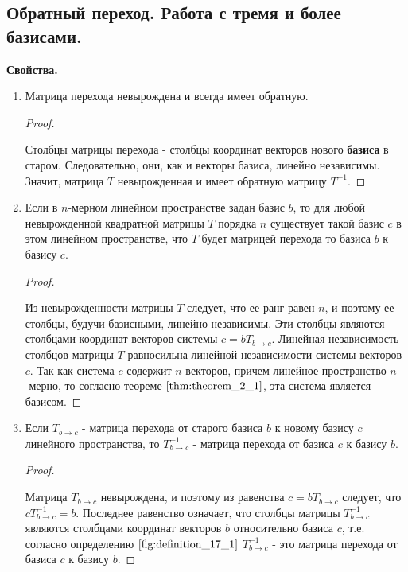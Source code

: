 \subsection{
    Обратный переход. Работа с тремя и более базисами.
}

\textbf{Свойства.}

\begin{enumerate}[label={\arabic*°.}]
    \item Матрица перехода невырождена и всегда имеет обратную.
    \begin{proof}~

        Столбцы матрицы перехода - столбцы координат векторов нового \textbf{базиса} в старом. Следовательно, они, как и векторы базиса, линейно независимы. Значит, матрица $T$ невырожденная и имеет обратную матрицу $T^{-1}$.
    \end{proof}
    
    \item Если в $n$-мерном линейном пространстве задан базис $b$, то для любой невырожденной квадратной матрицы $T$ порядка $n$ существует такой базис $c$ в этом линейном пространстве, что $T$ будет матрицей перехода то базиса $b$ к базису $c$.
    \begin{proof}~

        Из невырожденности матрицы $T$ следует, что ее ранг равен $n$, и поэтому ее столбцы, будучи базисными, линейно независимы. Эти столбцы являются столбцами координат векторов системы $c = bT_{b \to c}$. Линейная независимость столбцов матрицы $T$ равносильна линейной независимости системы векторов $c$. Так как система $c$ содержит $n$ векторов, причем линейное пространство $n$-мерно, то согласно теореме $\eqref{thm:theorem_2_1}$, эта система является базисом.
    \end{proof}
    
    \item Если $T_{b \to c}$ - матрица перехода от старого базиса $b$ к новому базису $c$ линейного пространства, то $T^{-1}_{b \to c}$ - матрица перехода от базиса $c$ к базису $b$.
    \begin{proof}~

        Матрица $T_{b \to c}$ невырождена, и поэтому из равенства $c = bT_{b \to c}$ следует, что $cT^{-1}_{b \to c} = b$. Последнее равенство означает, что столбцы матрицы $T^{-1}_{b \to c}$ являются столбцами координат векторов $b$ относительно базиса $c$, т.е. согласно определению $\eqref{fig:definition_17_1}$ $T^{-1}_{b \to c}$ - это матрица перехода от базиса $c$ к базису $b$.
    \end{proof}


\end{enumerate}
